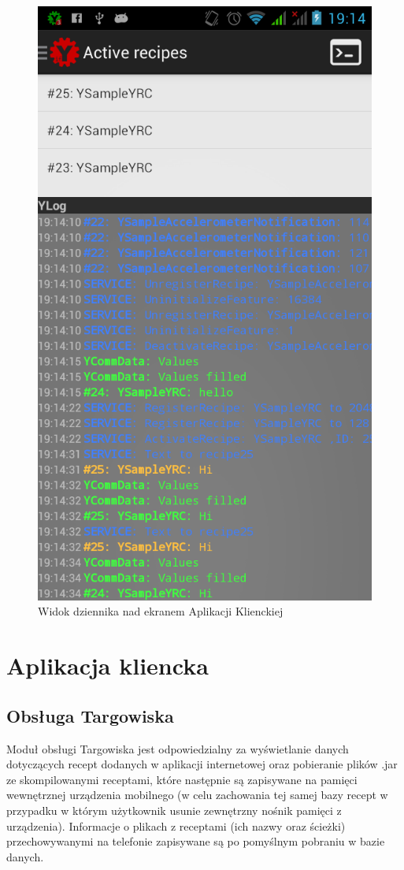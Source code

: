 \documentclass[11pt,a4paper,polish,thesis]{dcsbook}
\begin{document}
\begin{figure}[H]
  \centering
  \includegraphics[scale=0.3]{./resources/logs.png}
  \caption{Widok dziennika nad ekranem Aplikacji Klienckiej}
  \label{fig:market_tree}
\end{figure}

\section{Aplikacja kliencka}
\subsection {Obsługa Targowiska}
Moduł obsługi Targowiska jest odpowiedzialny za  wyświetlanie danych dotyczących recept dodanych w aplikacji internetowej oraz pobieranie plików .jar ze skompilowanymi receptami, które następnie są zapisywane na pamięci wewnętrznej urządzenia mobilnego (w celu zachowania tej samej bazy recept w przypadku w którym użytkownik usunie zewnętrzny nośnik pamięci z urządzenia). Informacje o plikach z receptami (ich nazwy oraz ścieżki) przechowywanymi na telefonie zapisywane są po pomyślnym pobraniu w  bazie danych.
\end{document}
